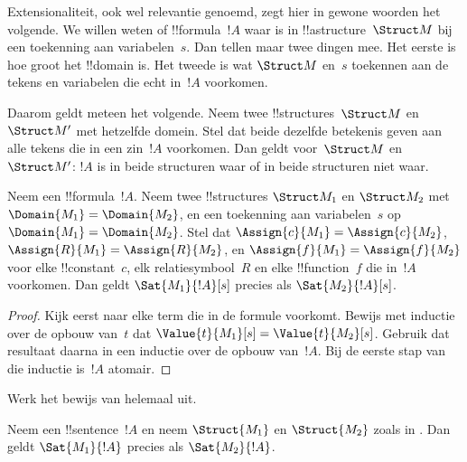 \documentclass[../../../include/open-logic-section]{subfiles}
\begin{document}


\begin{explain}
Extensionaliteit, ook wel relevantie genoemd, zegt hier in gewone
woorden het volgende. We willen weten of !!{formula}~$!A$ waar is in
!!a{structure}~$\Struct M$ bij een toekenning aan variabelen~$s$.
Dan tellen maar twee dingen mee. Het eerste is hoe groot het !!{domain}
is. Het tweede is wat $\Struct M$ en~$s$ toekennen aan de tekens en
variabelen die echt in~$!A$ voorkomen.

Daarom geldt meteen het volgende. Neem twee !!{structure}s~$\Struct M$
en~$\Struct M'$ met hetzelfde domein. Stel dat beide dezelfde betekenis
geven aan alle tekens die in een zin~$!A$ voorkomen. Dan geldt
voor~$\Struct M$ en~$\Struct M'$: $!A$ is in beide structuren waar of
in beide structuren niet waar.
\end{explain}

\begin{prop}[Extensionaliteit]
  Neem een !!{formula}~$!A$. Neem twee !!{structure}s $\Struct M_1$
  en $\Struct M_2$ met $\Domain{M_1} = \Domain{M_2}$, en een
  toekenning aan variabelen~$s$ op
  $\Domain{M_1} = \Domain{M_2}$. Stel dat
  $\Assign{c}{M_1} = \Assign{c}{M_2}$, $\Assign{R}{M_1}=\Assign{R}{M_2}$,
  en $\Assign{f}{M_1} = \Assign{f}{M_2}$ voor elke !!{constant}~$c$,
  elk relatiesymbool~$R$ en elke !!{function}~$f$ die in~$!A$
  voorkomen. Dan geldt $\Sat{M_1}{!A}[s]$ precies als
  $\Sat{M_2}{!A}[s]$.
\end{prop}

\begin{proof}
  Kijk eerst naar elke term die in de formule voorkomt. Bewijs met
  inductie over de opbouw van~$t$ dat
  $\Value{t}{M_1}[s] = \Value{t}{M_2}[s]$. Gebruik dat resultaat
  daarna in een inductie over de opbouw van~$!A$. Bij de eerste stap
  van die inductie is~$!A$ atomair.
\end{proof}

\begin{prob}
Werk het bewijs van 
helemaal uit.
\end{prob}

\begin{cor}
  Neem een !!{sentence}~$!A$ en neem $\Struct{M_1}$ en $\Struct{M_2}$
  zoals in . Dan geldt
  $\Sat{M_1}{!A}$ precies als $\Sat{M_2}{!A}$.
\end{cor}
\end{document}
